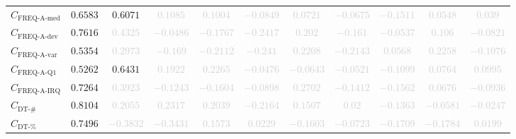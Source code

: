 \documentclass{standalone}
\newcommand{\actfreqmedianname}{\text{FREQ-A-med}}
\newcommand{\actfreqmedian}{C_{\actfreqmedianname}}
\newcommand{\actfreqdevname}{\text{FREQ-A-dev}}
\newcommand{\actfreqdev}{C_{\actfreqdevname}}
\newcommand{\actfreqvarname}{\text{FREQ-A-var}}
\newcommand{\actfreqvar}{C_{\actfreqvarname}}
\newcommand{\actfreqqonename}{\text{FREQ-A-Q1}}
\newcommand{\actfreqqone}{C_{\actfreqqonename}}
\newcommand{\actfreqiqrname}{\text{FREQ-A-IRQ}}
\newcommand{\actfreqiqr}{C_{\actfreqiqrname}}
\newcommand{\numberuniquetracesname}{\text{DT-\#}}
\newcommand{\numberuniquetraces}{C_{\numberuniquetracesname}}
\newcommand{\percentageuniquetracesname}{\text{DT-\%}}
\newcommand{\percentageuniquetraces}{C_{\percentageuniquetracesname}}
\begin{document}
\begin{tabular}{lcccccccccc}
$\actfreqmedian$ & $0.6583$ & $0.6071$ & \textcolor{lightgray}{$0.1085$} & \textcolor{lightgray}{$0.1004$} & \textcolor{lightgray}{$-0.0849$} & \textcolor{lightgray}{$0.0721$} & \textcolor{lightgray}{$-0.0675$} & \textcolor{lightgray}{$-0.1511$} & \textcolor{lightgray}{$0.0548$} & \textcolor{lightgray}{$0.039$} \\ 
$\actfreqdev$ & $0.7616$ & \textcolor{lightgray}{$0.4325$} & \textcolor{lightgray}{$-0.0486$} & \textcolor{lightgray}{$-0.1767$} & \textcolor{lightgray}{$-0.2417$} & \textcolor{lightgray}{$0.202$} & \textcolor{lightgray}{$-0.161$} & \textcolor{lightgray}{$-0.0537$} & \textcolor{lightgray}{$0.106$} & \textcolor{lightgray}{$-0.0821$} \\ 
$\actfreqvar$ & $0.5354$ & \textcolor{lightgray}{$0.2973$} & \textcolor{lightgray}{$-0.169$} & \textcolor{lightgray}{$-0.2112$} & \textcolor{lightgray}{$-0.241$} & \textcolor{lightgray}{$0.2208$} & \textcolor{lightgray}{$-0.2143$} & \textcolor{lightgray}{$0.0568$} & \textcolor{lightgray}{$0.2258$} & \textcolor{lightgray}{$-0.1076$} \\ 
$\actfreqqone$ & $0.5262$ & $0.6431$ & \textcolor{lightgray}{$0.1922$} & \textcolor{lightgray}{$0.2265$} & \textcolor{lightgray}{$-0.0476$} & \textcolor{lightgray}{$-0.0643$} & \textcolor{lightgray}{$-0.0521$} & \textcolor{lightgray}{$-0.1099$} & \textcolor{lightgray}{$0.0764$} & \textcolor{lightgray}{$0.0995$} \\ 
$\actfreqiqr$ & $0.7264$ & \textcolor{lightgray}{$0.3923$} & \textcolor{lightgray}{$-0.1243$} & \textcolor{lightgray}{$-0.1604$} & \textcolor{lightgray}{$-0.0898$} & \textcolor{lightgray}{$0.2702$} & \textcolor{lightgray}{$-0.1412$} & \textcolor{lightgray}{$-0.1562$} & \textcolor{lightgray}{$0.0676$} & \textcolor{lightgray}{$-0.0936$} \\ 
$\numberuniquetraces$ & $0.8104$ & \textcolor{lightgray}{$0.2055$} & \textcolor{lightgray}{$0.2317$} & \textcolor{lightgray}{$0.2039$} & \textcolor{lightgray}{$-0.2164$} & \textcolor{lightgray}{$0.1507$} & \textcolor{lightgray}{$0.02$} & \textcolor{lightgray}{$-0.1363$} & \textcolor{lightgray}{$-0.0581$} & \textcolor{lightgray}{$-0.0247$} \\ 
$\percentageuniquetraces$ & $0.7496$ & \textcolor{lightgray}{$-0.3832$} & \textcolor{lightgray}{$-0.3431$} & \textcolor{lightgray}{$0.1573$} & \textcolor{lightgray}{$0.0229$} & \textcolor{lightgray}{$-0.1603$} & \textcolor{lightgray}{$-0.0723$} & \textcolor{lightgray}{$-0.1709$} & \textcolor{lightgray}{$-0.1784$} & \textcolor{lightgray}{$0.0199$} \\ 

\end{tabular}
\end{document}
